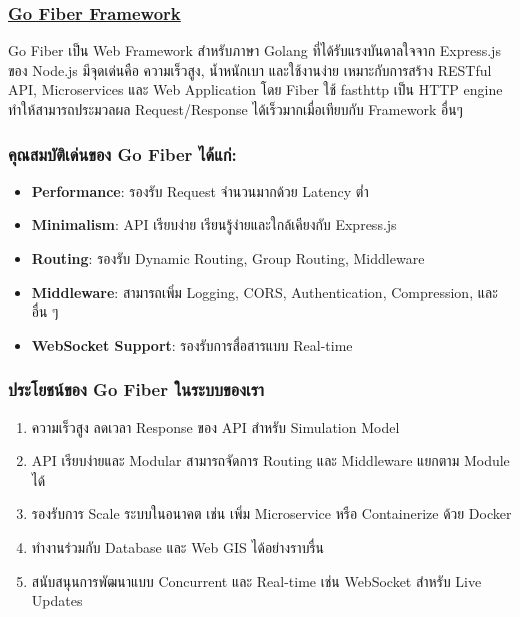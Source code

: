 \subsubsection{\textbf{\underline{Go Fiber Framework}}}
\begin{mypara}
    \indent Go Fiber เป็น Web Framework สำหรับภาษา Golang ที่ได้รับแรงบันดาลใจจาก Express.js ของ Node.js มีจุดเด่นคือ ความเร็วสูง, น้ำหนักเบา และใช้งานง่าย เหมาะกับการสร้าง RESTful API, Microservices และ Web Application โดย Fiber ใช้ fasthttp เป็น HTTP engine ทำให้สามารถประมวลผล Request/Response ได้เร็วมากเมื่อเทียบกับ Framework อื่นๆ  
\end{mypara}

\subsubsection{\textbf{คุณสมบัติเด่นของ Go Fiber ได้แก่:}}
\begin{itemize}
    \item \textbf{Performance}: รองรับ Request จำนวนมากด้วย Latency ต่ำ  
    \item \textbf{Minimalism}: API เรียบง่าย เรียนรู้ง่ายและใกล้เคียงกับ Express.js  
    \item \textbf{Routing}: รองรับ Dynamic Routing, Group Routing, Middleware  
    \item \textbf{Middleware}: สามารถเพิ่ม Logging, CORS, Authentication, Compression, และอื่น ๆ  
    \item \textbf{WebSocket Support}: รองรับการสื่อสารแบบ Real-time  
\end{itemize}

\subsubsection{\textbf{ประโยชน์ของ Go Fiber ในระบบของเรา}}
\begin{enumerate}
    \item ความเร็วสูง ลดเวลา Response ของ API สำหรับ Simulation Model
    \item API เรียบง่ายและ Modular สามารถจัดการ Routing และ Middleware แยกตาม Module ได้
    \item รองรับการ Scale ระบบในอนาคต เช่น เพิ่ม Microservice หรือ Containerize ด้วย Docker
    \item ทำงานร่วมกับ Database และ Web GIS ได้อย่างราบรื่น
    \item สนับสนุนการพัฒนาแบบ Concurrent และ Real-time เช่น WebSocket สำหรับ Live Updates
\end{enumerate}

